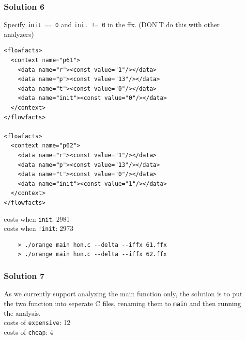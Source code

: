 \documentclass{beamer}
\begin{document}
\begin{frame}[fragile]
  \frametitle{Solution 6}
  Specify {\tt init == 0} and {\tt init != 0} in the ffx. (DON'T do this with other analyzers)
  {\small
  \begin{verbatim}
<flowfacts>
  <context name="p61">
    <data name="r"><const value="1"/></data>
    <data name="p"><const value="13"/></data>
    <data name="t"><const value="0"/></data>
    <data name="init"><const value="0"/></data>
  </context>
</flowfacts>

<flowfacts>
  <context name="p62">
    <data name="r"><const value="1"/></data>
    <data name="p"><const value="13"/></data>
    <data name="t"><const value="0"/></data>
    <data name="init"><const value="1"/></data>
  </context>
</flowfacts>  
  \end{verbatim}
  }
  costs when {\tt init}: 2981 \\
  costs when {\tt !init}: 2973
  {\small
  \begin{verbatim}
    > ./orange main hon.c --delta --iffx 61.ffx
    > ./orange main hon.c --delta --iffx 62.ffx
  \end{verbatim}
  }
\end{frame}



\begin{frame}[fragile]
  \frametitle{Solution 7}
  As we currently support analyzing the main function only, the solution is to 
  put the two function into seperate C files, renaming them to {\tt main} and then
  running the analysis. \\
  costs of {\tt expensive}: 12 \\
  costs of {\tt cheap}: 4 \\
\end{frame}


\end{document}
